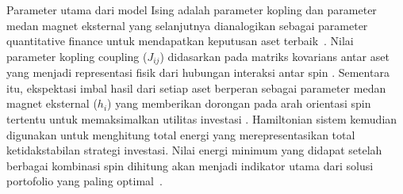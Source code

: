 Parameter utama dari model Ising adalah parameter kopling dan  parameter medan magnet eksternal yang selanjutnya dianalogikan sebagai parameter quantitative finance untuk mendapatkan keputusan aset terbaik~. Nilai parameter kopling coupling ($J_{ij}$) didasarkan pada matriks kovarians antar aset yang menjadi representasi fisik dari hubungan interaksi antar spin \cite{galam_ising_2010}. Sementara itu, ekspektasi imbal hasil dari setiap aset berperan sebagai parameter medan magnet eksternal ($h_i$) yang memberikan dorongan pada arah orientasi spin tertentu untuk memaksimalkan utilitas investasi \cite{lucas_ising_2014}. Hamiltonian sistem kemudian digunakan untuk menghitung total energi yang merepresentasikan total ketidakstabilan strategi investasi. Nilai energi minimum yang didapat setelah berbagai kombinasi spin dihitung akan menjadi indikator utama dari solusi portofolio yang paling optimal~.

